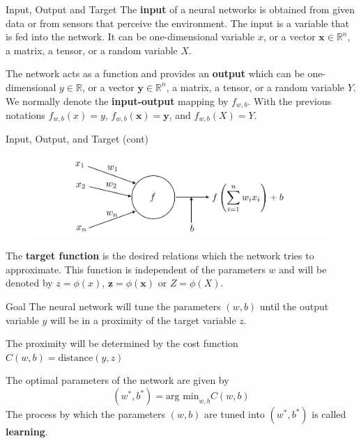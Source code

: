 \documentclass{beamer}
\begin{document}
\begin{frame}{Input, Output and Target}
	The \textbf{input} of a neural networks is obtained from given data or from sensors that perceive the environment. The input is a variable that is fed into the network. It can be one-dimensional variable $x$, or a vector $\textbf{x} \in \mathbb{R}^n$, a matrix, a tensor, or a random variable $X$. 
	
	The network acts as a function and provides an \textbf{output} which can be one-dimensional $y \in \mathbb{R}$, or a vector $\textbf{y} \in \mathbb{R}^n$, a matrix, a tensor, or a random variable $Y$. We normally denote the \textbf{input-output} mapping by $f_{w,b}$. With the previous notations $f_{w,b}(x)=y$, $f_{w,b}(\textbf{x})= \textbf{y}$, and $f_{w,b}(X)=Y$.

\end{frame}
\begin{frame}{Input, Output, and Target (cont)}

	\begin{figure}[h]
	\centering
	\includegraphics{../../Figures/fig_target.png}
\end{figure}	
	The \textbf{target function} is the desired relations which the network tries to approximate. This function is independent of the parameters $w$ and will be denoted by $z=\phi(x)$, $\textbf{z}=\phi(\textbf{x})$ or $Z=\phi(X)$.  
	 
	
\end{frame}

\begin{frame}{Goal}
	The neural network will tune the parameters $(w,b)$ until the output variable $y$ will be in a proximity of the target variable $z$. 
	
	The proximity will be determined by the cost function $C(w,b)=\text{distance}(y,z)$
	
	The optimal parameters of the network are given  by 
	\begin{equation*}
		(w^*,b^*)= \text{arg min}_{w,b} C(w,b)
	\end{equation*}
	The process by which the parameters $(w,b)$ are tuned into $(w^*,b^*)$ is called \textbf{learning}.
\end{frame}
\end{document}
